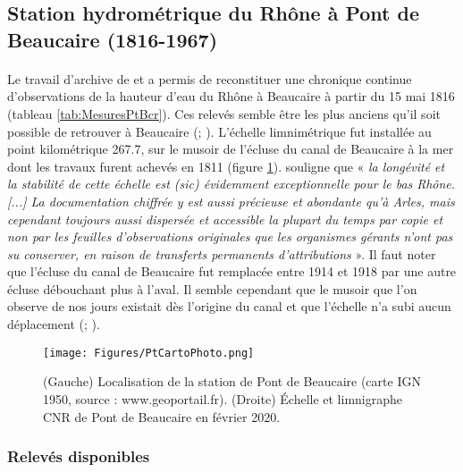 \documentclass[11pt]{article}
\begin{document}
	
\FloatBarrier

	\subsection{Station hydrométrique du Rhône à Pont de Beaucaire (1816-1967)}
		
	\paragraph{} Le travail d'archive de \citet{pichard_les_1995} et \citet{pichard_hydro-climatology_2017} a permis de reconstituer une chronique continue d'observations de la hauteur d'eau du Rhône à Beaucaire à partir du 15 mai 1816 (tableau \ref{tab:MesuresPtBcr}). Ces relevés semble être les plus anciens qu'il soit possible de retrouver à Beaucaire (\cite{parde_regime_1925}; \cite{pichard_les_1995}). L'échelle limnimétrique fut installée au point kilométrique 267.7, sur le musoir de l'écluse du canal de Beaucaire à la mer dont les travaux furent achevés en 1811 (figure \ref{fig:CartoPt}). \citet{pichard_hauteurs_2013} souligne que « \textit{la longévité et la stabilité de cette échelle est (sic) évidemment exceptionnelle pour le bas Rhône. [...] La documentation chiffrée y est aussi précieuse et abondante qu'à Arles, mais cependant toujours aussi dispersée et accessible la plupart du temps par copie et non par les feuilles d'observations originales que les organismes gérants n'ont pas su conserver, en raison de transferts permanents d'attributions} ». Il faut noter que l'écluse du canal de Beaucaire fut remplacée entre 1914 et 1918 par une autre écluse débouchant plus à l'aval. Il semble cependant que le musoir que l'on observe de nos jours existait dès l'origine du canal et que l'échelle n'a subi aucun déplacement (\cite{pichard_hauteurs_2013}; \cite{bard_actualisation_2018}). 
	
	\begin{figure}[h]
	\centering
		\texttt{[image: Figures/PtCartoPhoto.png]}
        \caption{(Gauche) Localisation de la station de Pont de Beaucaire (carte IGN 1950, source : www.geoportail.fr). (Droite) Échelle et limnigraphe CNR de Pont de Beaucaire en février 2020.}	
		\label{fig:CartoPt}
	\end{figure}
		
	\subsubsection{Relevés disponibles}
\end{document}

